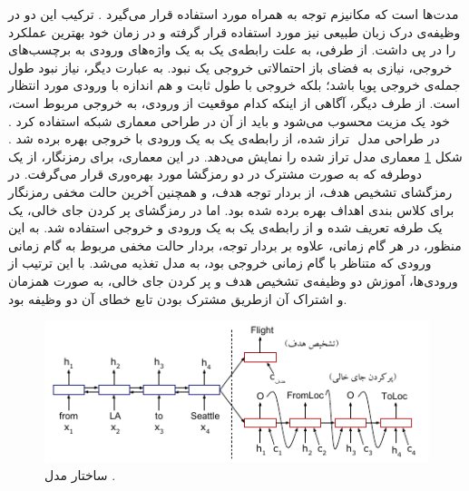 مدت‌ها است که مکانیزم توجه به همراه  مورد استفاده قرار می‌گیرد \cite{varghese2020bidirectional,jaech2016domain}. ترکیب این دو در وظیفه‌ی درک زبان طبیعی نیز مورد استفاده قرار گرفته و در زمان خود بهترین عملکرد را در پی داشت. از طرفی، به علت رابطه‌ی یک به یک واژه‌های ورودی به برچسب‌های خروجی، نیازی به فضای باز احتمالاتی خروجی یک  نبود. به عبارت دیگر، نیاز نبود طول جمله‌ی خروجی پویا باشد؛ بلکه خروجی با طول ثابت و هم اندازه با ورودی مورد انتظار است. از طرف دیگر، آگاهی از اینکه کدام موقعیت از ورودی، به خروجی مربوط است، خود یک مزیت محسوب می‌شود و باید از آن در طراحی معماری شبکه استفاده کرد \cite{xu2020end}. در طراحی مدل ‌ تراز شده، از رابطه‌ی یک به یک ورودی با خروجی بهره برده شد \cite{aligned_lstm_atten_nlu}. شکل \ref{Fig:alignedlstm} معماری مدل تراز شده را نمایش می‌دهد. در این معماری، برای رمزنگار، از یک  دوطرفه که به صورت مشترک در دو رمزگشا مورد بهره‌وری قرار می‌گرفت. در رمزگشای تشخیص هدف، از بردار توجه هدف، و همچنین آخرین حالت مخفی  رمزنگار برای کلاس بندی اهداف بهره برده شده بود. اما در رمزگشای پر کردن جای خالی، یک  یک طرفه تعریف شده و از رابطه‌ی یک به یک ورودی و خروجی استفاده شد. به این منظور، در هر گام زمانی، علاوه بر بردار توجه، بردار حالت مخفی مربوط به گام زمانی ورودی که متناظر با گام زمانی خروجی بود، به مدل تغذیه می‌شد. با این ترتیب از ورودی‌ها، آموزش دو وظیفه‌ی تشخیص هدف و پر کردن جای خالی، به صورت همزمان و اشتراک آن ازطریق مشترک بودن تابع خطای آن دو وظیفه بود.
\begin{figure}[!htb]
	\centering
	\includegraphics[scale=1.6]{Figures/alignedcnnblstm.pdf}
	\caption[ساختار مدل ]{ساختار مدل  \cite{aligned_lstm_atten_nlu}.}
	\label{Fig:alignedlstm}
\end{figure}


